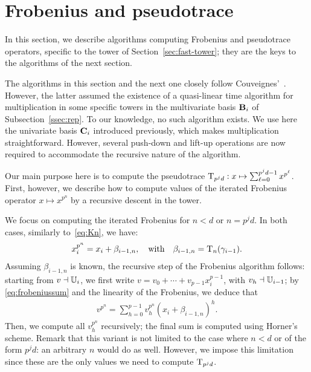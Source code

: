 \section{Frobenius and pseudotrace}
\label{sec:pseudotrace-frobenius}

In this section, we describe algorithms computing Frobenius
and pseudotrace operators, specific to the tower of
Section~\ref{sec:fast-tower}; they are the keys to the algorithms of
the next section.

The algorithms in this section and the next one closely follow
Couveignes'~\cite{Couveignes00}. However, the latter assumed the
existence of a quasi-linear time algorithm for multiplication in some
specific towers in the multivariate basis $\mathbf{B}_i$ of
Subsection~\ref{ssec:rep}. To our knowledge, no such algorithm
exists. We use here the univariate basis $\mathbf{C}_i$ introduced
previously, which makes multiplication straightforward. However,
several push-down and lift-up operations are now required to
accommodate the recursive nature of the algorithm.

Our main purpose here is to compute the pseudotrace
${\operatorname{T}_{p^jd}:x\mapsto\sum_{\ell=0}^{p^jd-1}x^{p^{\ell}}}$. First, however,
we describe how to compute values of the iterated Frobenius operator
$x \mapsto x^{p^n}$ by a recursive descent in the tower.

We focus on computing the iterated Frobenius for $n<d$ or $n=p^jd$. In
both cases, similarly to~\eqref{eq:Kn}, we have:
\begin{gather}
  \label{eq:frobeniussum}
  x_i^{p^{n}} = x_i + \beta_{i-1,n}, \quad\text{with}\quad \beta_{i-1,n}=\operatorname{T}_{n}(\gamma_{i-1}).
\end{gather}
Assuming $\beta_{i-1,n}$ is known, the recursive step of the Frobenius
algorithm follows: starting from $v\dashv\mathbb{U}_i$, we first write
$v=v_0+\cdots+v_{p-1}x_i^{p-1}$, with $v_h\dashv\mathbb{U}_{i-1}$; by
\eqref{eq:frobeniussum} and the linearity of the Frobenius, we deduce
that
\begin{equation*}
  \label{eq:frobeniuscomp}
\begin{array}{c}
v^{p^n}
  =\sum_{h=0}^{p-1} v_h^{p^n} \left(x_i + \beta_{i-1,n}\right)^{h}.
\end{array}
\end{equation*}
Then, we compute all $v_h^{p^n}$ recursively; the final sum is
computed using Horner's scheme. Remark that this variant is not
limited to the case where $n<d$ or of the form $p^jd$: an arbitrary
$n$ would do as well. However, we impose this limitation since these
are the only values we need to compute $\operatorname{T}_{p^jd}$.

